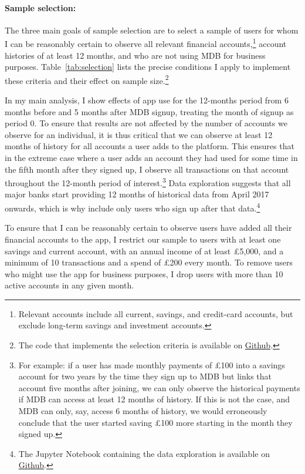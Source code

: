 \paragraph{Sample selection:}%
\label{par:sample_selection_}

The three main goals of sample selection are to select a sample of users for
whom I can be reasonably certain to observe all relevant financial
accounts,\footnote{Relevant accounts include all current, savings, and
credit-card accounts, but exclude long-term savings and investment accounts.}
account histories of at least 12 months, and who are not using MDB for business
purposes. Table~\ref{tab:selection} lists the precise conditions I apply to
implement these criteria and their effect on sample size.\footnote{The code
that implements the selection criteria is available on
\href{https://github.com/fabiangunzinger/mdb_eval/blob/main/src/data/selectors.py}{Github}.}

In my main analysis, I show effects of app use for the 12-months period from 6
months before and 5 months after MDB signup, treating the month of signup as
period 0. To ensure that results are not affected by the number of accounts we
observe for an individual, it is thus critical that we can observe at least 12
months of history for all accounts a user adds to the platform. This ensures
that in the extreme case where a user adds an account they had used for some
time in the fifth month after they signed up, I observe all transactions on
that account throughout the 12-month period of interest.\footnote{For example:
    if a user has made monthly payments of \pounds100 into a savings account
    for two years by the time they sign up to MDB but links that account five
    months after joining, we can only observe the historical payments if MDB
    can access at least 12 months of history. If this is not the case, and MDB
    can only, say, access 6 months of history, we would erroneously conclude
that the user started saving \pounds100 more starting in the month they signed
up.} Data exploration suggests that all major banks start providing 12 months
of historical data from April 2017 onwards, which is why include only users who
sign up after that data.\footnote{The Jupyter Notebook containing the data
exploration is available on
\href{https://github.com/fabiangunzinger/mdb_eval/blob/371493bd78870cab7a303edb70687287e5bca4a9/notebooks/available_account_history.ipynb}{Github}.}

To ensure that I can be reasonably certain to observe users have added all
their financial accounts to the app, I restrict our sample to users with at
least one savings and current account, with an annual income of at least
\pounds5,000, and a minimum of 10 transactions and a spend of \pounds200 every
month. To remove users who might use the app for business purposes, I drop
users with more than 10 active accounts in any given month.

